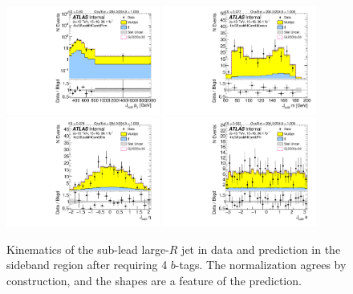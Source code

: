 \begin{figure}[htbp!]
\begin{center}
\includegraphics[angle=270, width=0.45\textwidth]{./figures/boosted/Sideband/b77_FourTag_Sideband_sublHCand_Pt_m_1.pdf}
\includegraphics[angle=270, width=0.45\textwidth]{./figures/boosted/Sideband/b77_FourTag_Sideband_sublHCand_Mass_s.pdf}\\
\includegraphics[angle=270, width=0.45\textwidth]{./figures/boosted/Sideband/b77_FourTag_Sideband_sublHCand_Eta.pdf}
\includegraphics[angle=270, width=0.45\textwidth]{./figures/boosted/Sideband/b77_FourTag_Sideband_sublHCand_Phi.pdf}
  \caption{Kinematics of the sub-lead large-$R$ jet in data and prediction in the sideband region after requiring 4 $b$-tags. The normalization agrees by construction, and the shapes are a feature of the prediction.}
  \label{fig:boosted-4b-sideband-ak10-subl}
\end{center}
\end{figure}

